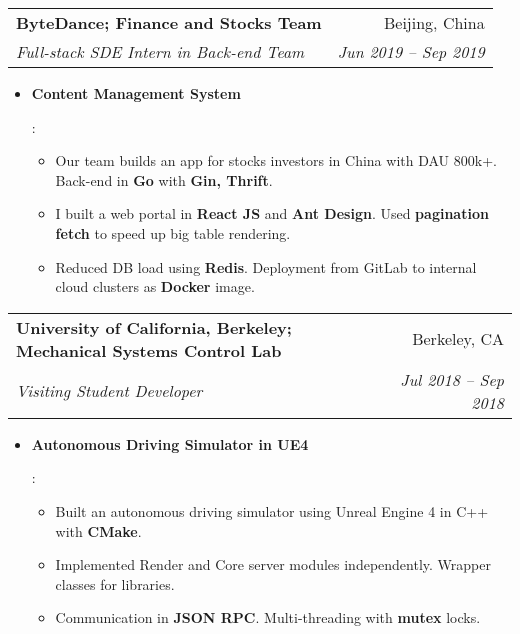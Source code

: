 \documentclass[letterpaper,11pt]{article}
\makeatletter
\newcommand{\resumeItem}[2]{
  \item\small{
    \textbf{#1}{: #2 \vspace{-2pt}}
  }
}
\newcommand{\resumeSubheading}[4]{
  \vspace{-1pt}\item
    \begin{tabular*}{0.97\textwidth}[t]{l@{\extracolsep{\fill}}r}
      \textbf{#1} & #2 \\
      \textit{\small#3} & \textit{\small #4} \\
    \end{tabular*}\vspace{-5pt}
}
\newcommand{\resumeItemListStart}{\begin{itemize}}
\newcommand{\resumeItemListEnd}{\end{itemize}\vspace{-5pt}}
\makeatother
\begin{document}
    \resumeSubheading
      {ByteDance; Finance and Stocks Team}{Beijing, China}
      {Full-stack SDE Intern in Back-end Team}{Jun 2019 -- Sep 2019}
      \resumeItemListStart
        \resumeItem{Content Management System}{
          \begin{itemize}
            \item Our team builds an app for stocks investors in China with DAU 800k+. Back-end in \textbf{Go} with \textbf{Gin, Thrift}.
            \item I built a web portal in \textbf{React JS} and \textbf{Ant Design}. Used \textbf{pagination fetch} to speed up big table rendering.
            \item Reduced DB load using \textbf{Redis}. Deployment from GitLab to internal cloud clusters as \textbf{Docker} image.
          \end{itemize}
        }
      \resumeItemListEnd

    \resumeSubheading
      {University of California, Berkeley; Mechanical Systems Control Lab}{Berkeley, CA}
      {Visiting Student Developer}{Jul 2018 -- Sep 2018}
      \resumeItemListStart
        \resumeItem{Autonomous Driving Simulator in UE4}{
          \begin{itemize}
            \item Built an autonomous driving simulator using Unreal Engine 4 in C++ with \textbf{CMake}.
            \item Implemented Render and Core server modules independently. Wrapper classes for libraries.
            \item Communication in \textbf{JSON RPC}. Multi-threading with \textbf{mutex} locks.
          \end{itemize}
        }
      \resumeItemListEnd
\end{document}

